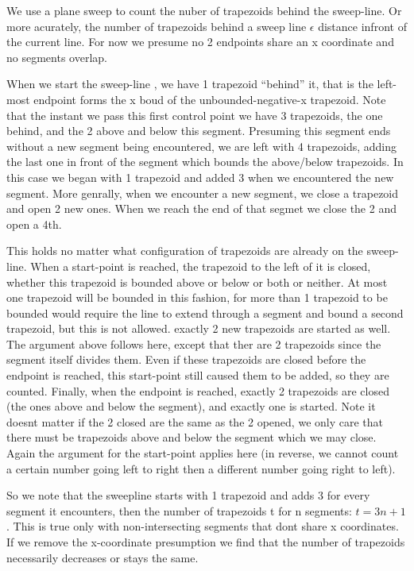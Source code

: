 \documentclass{article}
\begin{document}
We use a plane sweep to count the nuber of trapezoids behind the sweep-line.
Or more acurately, the number of trapezoids behind a sweep line $\epsilon$ distance infront of the current line.
For now we presume no 2 endpoints share an x coordinate and no segments overlap.

When we start the sweep-line , we have 1 trapezoid ``behind'' it, that is the left-most endpoint forms the x boud of the unbounded-negative-x trapezoid.
Note that the instant we pass this first control point we have 3 trapezoids, the one behind, and the 2 above and below this segment.
Presuming this segment ends without a new segment being encountered, we are left with 4 trapezoids, adding the last one in front of the segment which bounds the above/below trapezoids.
In this case we began with 1 trapezoid and added 3 when we encountered the new segment.
More genrally, when we encounter a new segment, we close a trapezoid and open 2 new ones.
When we reach the end of that segmet we close the 2 and open a 4th.

This holds no matter what configuration of trapezoids are already on the sweep-line.
When a start-point is reached, the trapezoid to the left of it is closed, whether this trapezoid is bounded above or below or both or neither.
At most one trapezoid will be bounded in this fashion, for more than 1 trapezoid to be bounded would require the line to extend through a segment and bound a second trapezoid, but this is not allowed.
exactly 2 new trapezoids are started as well.
The argument above follows here, except that ther are 2 trapezoids since the segment itself divides them.
Even if these trapezoids are closed before the endpoint is reached, this start-point still caused them to be added, so they are counted.
Finally, when the endpoint is reached, exactly 2 trapezoids are closed (the ones above and below the segment), and exactly one is started.
Note it doesnt matter if the 2 closed are the same as the 2 opened, we only care that there must be trapezoids above and below the segment which we may close.
Again the argument for the start-point applies here (in reverse, we cannot count a certain number going left to right then a different number going right to left).

So we note that the sweepline starts with 1 trapezoid and adds 3 for every segment it encounters, then the number of trapezoids t for n segments: $t = 3n + 1$.
This is true only with non-intersecting segments that dont share x coordinates.
If we remove the x-coordinate presumption we find that the number of trapezoids necessarily decreases or stays the same.
\end{document}
